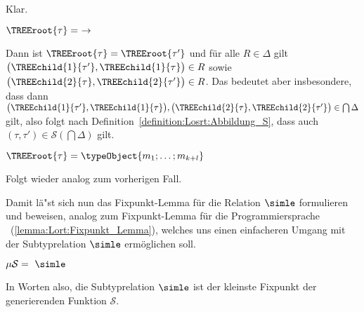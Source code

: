 \begin{beweis}
          Klar.

    \item $\TREEroot{\tau}=\ \to$

          Dann ist $\TREEroot{\tau} = \TREEroot{\tau'}$ und f\"ur alle $R\in\Delta$ gilt
          $\bigl(\TREEchild{1}{\tau'},\TREEchild{1}{\tau}\bigr)\in{R}$ sowie
          $\bigl(\TREEchild{2}{\tau},\TREEchild{2}{\tau'}\bigr)\in{R}$. Das bedeutet aber insbesondere, dass dann
          $\bigl(\TREEchild{1}{\tau'},\TREEchild{1}{\tau}\bigr),
           \bigl(\TREEchild{2}{\tau},\TREEchild{2}{\tau'}\bigr)\in\bigcap\Delta$ gilt, also folgt nach
          Definition~\ref{definition:Losrt:Abbildung_S}, dass auch $(\tau,\tau')\in\mathcal{S}(\bigcap\Delta)$ gilt.

    \item $\TREEroot{\tau}=\typeObject{m_1;\ldots;m_{k+l}}$

          Folgt wieder analog zum vorherigen Fall.
  \PROOFCASEend
\end{beweis}
%
Damit l\"a"st sich nun das Fixpunkt-Lemma f\"ur die Relation $\simle$ formulieren und beweisen,
analog zum Fixpunkt-Lemma f\"ur die Programmiersprache \Lort\ (\ref{lemma:Lort:Fixpunkt_Lemma}),
welches uns einen einfacheren Umgang mit der Subtyprelation $\simle$ erm\"oglichen soll.

\begin{lemma} \label{lemma:Losrt:Fixpunkt_Lemma}
  $\mu\mathcal{S}=\ \simle$
\end{lemma}

In Worten also, die Subtyprelation $\simle$ ist der kleinste Fixpunkt der generierenden Funktion $\mathcal{S}$.

